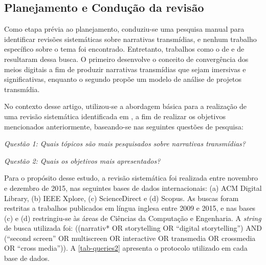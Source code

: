 \documentclass[
article,			%
11pt,				%
oneside,			%
a4paper,			%
english,			%
brazil,				%
sumario=tradicional
]{abntex2}
\begin{document}
  \subsection{Planejamento e Condução da revisão}

  Como etapa prévia ao planejamento, conduziu-se uma pesquisa manual para identificar revisões sistemáticas sobre narrativas transmídias, e nenhum trabalho específico sobre o tema foi encontrado. Entretanto, trabalhos como o de  e de  resultaram dessa busca. O primeiro desenvolve o conceito de convergência dos meios digitais a fim de produzir narrativas transmídias que sejam imersivas e significativas, enquanto o segundo propõe um modelo de análise de projetos transmídia.

  No contexto desse artigo, utilizou-se a abordagem básica para a realização de uma revisão sistemática identificada em , a fim de realizar os objetivos mencionados anteriormente, baseando-se nas seguintes questões de pesquisa:

  \emph{Questão 1: Quais tópicos são mais pesquisados sobre narrativas transmídias?}

  \emph{Questão 2: Quais os objetivos mais apresentados?}


  Para o propósito desse estudo, a revisão sistemática foi realizada entre novembro e dezembro de 2015, nas seguintes bases de dados internacionais: (a) ACM Digital Library, (b) IEEE Xplore, (c) ScienceDirect e (d) Scopus. As buscas foram restritas a trabalhos publicados em língua inglesa entre 2009 e 2015, e nas bases (c) e (d) restringiu-se às áreas de Ciências da Computação e Engenharia.  A \textit{string} de busca utilizada foi: ((narrativ* OR storytelling OR ``digital storytelling'') AND (``second screen'' OR multiscreen OR interactive OR transmedia OR crossmedia OR ``cross media'')). A \autoref{tab-queries2} apresenta o protocolo utilizado em cada base de dados.
\end{document}
